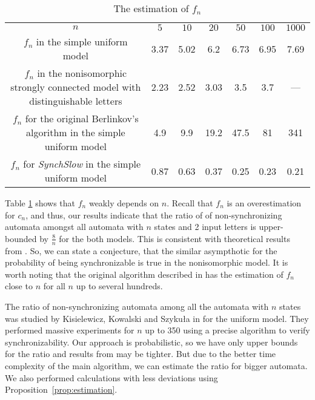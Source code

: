 \documentclass{jalc}
\begin{document}
\begin{table}
\caption{The estimation of $f_n$}
\centering
\setlength\tabcolsep{3pt}
\begin{tabular}{c|c|c|c|c|c|c}
\hline\noalign{\smallskip}
$n$ \quad & \quad $5$ \quad & \quad $10$ \quad & \quad $20$ \quad& \quad$50$ \quad&\quad $100$ \quad&\quad $1000$\\
\noalign{\smallskip}
\hline
\noalign{\smallskip}
  $f_n$ in the simple uniform model \quad & 3.37 & 5.02 & 6.2 & 6.73 & 6.95 & 7.69\\
  \thead{$f_n$ in the nonisomorphic \\ strongly connected model \\ with distinguishable letters \quad} & 2.23 & 2.52 & 3.03 & 3.5 & 3.7 & ---\\
  \thead{$f_n$ for the original Berlinkov's \\ algorithm in the simple uniform model \quad} & 4.9 & 9.9 & 19.2 & 47.5 & 81 & 341 \\
  \thead{$f_n$ for \emph{SynchSlow} \\ in the simple uniform model} & 0.87 & 0.63 & 0.37 & 0.25 & 0.23 & 0.21\\
\hline
\end{tabular}
\label{tab:cn}
\end{table}

Table \ref{tab:cn} shows that $f_n$ weakly depends on $n$. Recall that $f_n$ is an overestimation for $c_n$, and thus, our results indicate that the ratio of of non-synchronizing automata amongst all automata with $n$ states and 2 input letters is upper-bounded by $\frac{8}{n}$ for the both models. This is consistent with theoretical results from \cite{berl,Berlinkov:preprint}. So, we can state a conjecture, that the similar asympthotic for the probability of being synchronizable is true in the nonisomorphic model. It is worth noting that the original algorithm described in \cite{Berlinkov:preprint} has the estimation of $f_n$ close to $n$ for all $n$ up to several hundreds.

The ratio of non-synchronizing automata among all the automata with $n$ states was studied by Kisielewicz, Kowalski and Szyku{\l}a in \cite{Kisielewicz2015} for the uniform model. They performed massive experiments for $n$ up to 350 using a precise algorithm to verify synchronizability. Our approach is probabilistic, so we have only upper bounds for the ratio and results from \cite{Kisielewicz2015} may be tighter. But due to the better time complexity of the main algorithm, we can estimate the ratio for bigger automata. We also performed calculations with less deviations using Proposition~\ref{prop:estimation}.
\end{document}
